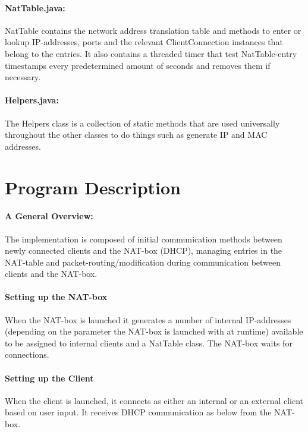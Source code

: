 \documentclass[12pt, a4paper]{article}
\begin{document}
\paragraph{NatTable.java:}
NatTable contains the network address translation table and methods to enter or lookup IP-addresses, ports and the relevant ClientConnection instances that belong to the entries. It also contains a threaded timer that test NatTable-entry timestamps every predetermined amount of seconds and removes them if necessary.


\paragraph{Helpers.java:}
The Helpers class is a collection of static methods that are used universally throughout the other classes to do things such as generate IP and MAC addresses.

\section{Program Description}
\paragraph{A General Overview:}
The implementation is composed of initial communication methods between newly connected clients and the NAT-box (DHCP), managing entries in the NAT-table and packet-routing/modification during communication between clients and the NAT-box.

\paragraph{Setting up the NAT-box}
When the NAT-box is launched it generates a number of internal IP-addresses (depending on the parameter the NAT-box is launched with at runtime) available to be assigned to internal clients and a NatTable class. The NAT-box waits for connections. 

\paragraph{Setting up the Client}
When the client is launched, it connects as either an internal or an external client based on user input. It receives DHCP communication as below from the NAT-box.  
\end{document}
